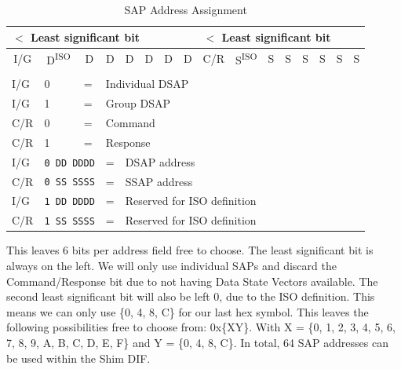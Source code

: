 \begin{table}[H]
	\begin{center}
		\begin{tabular}{|c|c|c|c|c|c|c|c|c|c|c|c|c|c|c|c|}
				\multicolumn{8}{|l|}{$<$ Least significant bit} & \multicolumn{8}{l|}{$<$ Least significant bit} \\
				\hline
				I/G & D\textsuperscript{ISO} & D & D & D & D & D & D & C/R & S\textsuperscript{ISO} & S & S & S & S & S & S \\
				\hline
				\multicolumn{16}{l}{} \\
				\multicolumn{1}{l}{I/G} & \multicolumn{1}{l}{0} & \multicolumn{1}{l}{=} & \multicolumn{13}{l}{Individual DSAP} \\
				\multicolumn{1}{l}{I/G} & \multicolumn{1}{l}{1} & \multicolumn{1}{l}{=} & \multicolumn{13}{l}{Group DSAP} \\
				\multicolumn{1}{l}{C/R} & \multicolumn{1}{l}{0} & \multicolumn{1}{l}{=} & \multicolumn{13}{l}{Command} \\
				\multicolumn{1}{l}{C/R} & \multicolumn{1}{l}{1} & \multicolumn{1}{l}{=} & \multicolumn{13}{l}{Response} \\
				\multicolumn{1}{l}{I/G} &  \multicolumn{2}{l}{\texttt{0 DD DDDD}} & \multicolumn{1}{l}{=} & \multicolumn{12}{l}{DSAP address} \\
				\multicolumn{1}{l}{C/R} &  \multicolumn{2}{l}{\texttt{0 SS SSSS}} & \multicolumn{1}{l}{=} & \multicolumn{12}{l}{SSAP address} \\
				\multicolumn{1}{l}{I/G} &  \multicolumn{2}{l}{\texttt{1 DD DDDD}} & \multicolumn{1}{l}{=} & \multicolumn{12}{l}{Reserved for ISO definition} \\
				\multicolumn{1}{l}{C/R} &  \multicolumn{2}{l}{\texttt{1 SS SSSS}} & \multicolumn{1}{l}{=} & \multicolumn{12}{l}{Reserved for ISO definition} \\
				
				
		\end{tabular}
		\caption{SAP Address Assignment}
	\end{center}
\end{table}

\npar

This leaves 6 bits per address field free to choose. The least significant bit is always on the left. We will only use individual SAPs and discard the Command/Response bit due to not having Data State Vectors available. The second least significant bit will also be left 0, due to the ISO definition. This means we can only use \{0, 4, 8, C\} for our last hex symbol. This leaves the following possibilities free to choose from: 0x\{XY\}. With X = \{0, 1, 2, 3, 4, 5, 6, 7, 8, 9, A, B, C, D, E, F\} and Y = \{0, 4, 8, C\}. In total, 64 SAP addresses can be used within the Shim DIF.




